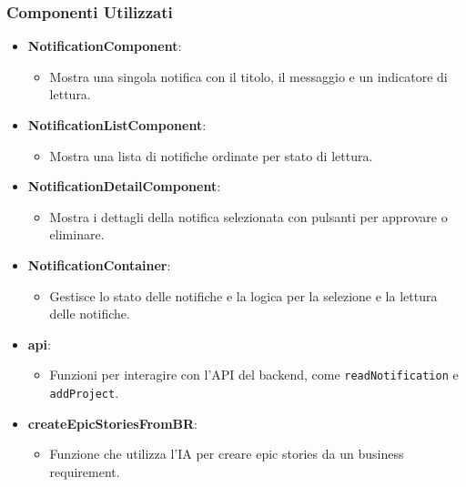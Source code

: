 \documentclass{article}
\begin{document}
\subsubsection*{Componenti Utilizzati}
\begin{itemize}
    \item \textbf{NotificationComponent}:
    \begin{itemize}
        \item Mostra una singola notifica con il titolo, il messaggio e un indicatore di lettura.
    \end{itemize}
    \item \textbf{NotificationListComponent}:
    \begin{itemize}
        \item Mostra una lista di notifiche ordinate per stato di lettura.
    \end{itemize}
    \item \textbf{NotificationDetailComponent}:
    \begin{itemize}
        \item Mostra i dettagli della notifica selezionata con pulsanti per approvare o eliminare.
    \end{itemize}
    \item \textbf{NotificationContainer}:
    \begin{itemize}
        \item Gestisce lo stato delle notifiche e la logica per la selezione e la lettura delle notifiche.
    \end{itemize}
    \item \textbf{api}:
    \begin{itemize}
        \item Funzioni per interagire con l'API del backend, come \texttt{readNotification} e \texttt{addProject}.
    \end{itemize}
    \item \textbf{createEpicStoriesFromBR}:
    \begin{itemize}
        \item Funzione che utilizza l'IA per creare epic stories da un business requirement.
    \end{itemize}
\end{itemize}
\end{document}
